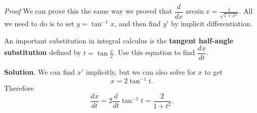 \documentclass[10pt,]{book}
\makeatletter
\newcommand{\terminology}[1]{\textbf{#1}}
\theoremstyle{ptxplainnotitle}
\theoremstyle{ptxplaintitle}
\theoremstyle{ptxplainnotitle}
\theoremstyle{ptxplaintitle}
\theoremstyle{ptxplainnotitle}
\theoremstyle{ptxplaintitle}
\renewcommand*{\proofname}{Proof}
\renewenvironment{proof}[1][\proofname]{\par
  \pushQED{\qed}%
  \normalfont \topsep6\p@\@plus6\p@\relax
  \trivlist
  \item\relax
    {\itshape
    #1\@addpunct{.}}\hspace\labelsep\ignorespaces
}{%
  \popQED\endtrivlist\@endpefalse
}
\theoremstyle{ptxdefinitionnotitle}
\theoremstyle{ptxdefinitiontitle}
\theoremstyle{ptxdefinitionnotitle}
\theoremstyle{ptxdefinitiontitle}
\theoremstyle{ptxdefinitionnotitle}
\theoremstyle{ptxdefinitiontitle}
\theoremstyle{ptxdefinitionnotitle}
\theoremstyle{ptxdefinitiontitle}
\theoremstyle{ptxdefinitionnotitle}
\theoremstyle{ptxdefinitiontitle}
\numberwithin{equation}{section}
\newcommand{\dv}[3][]{\dfrac{d^{#1} #2}{d #3^{#1}}}
\makeatother
\begin{document}
\begin{proof}\hypertarget{proof-7}{}
\hypertarget{p-279}{}%
We can prove this the same way we proved that \(\dv{}{x}\arcsin x = \frac{1}{\sqrt{1+x^{2}}}\). All we need to do is to set \(y = \tan^{-1}x\), and then find \(y'\) by implicit differentiation.%
\end{proof}
\begin{example}\label{example-tangent-half-angle-substitution}
\hypertarget{p-280}{}%
An important substitution in integral calculus is the \terminology{tangent half-angle substitution} defined by \(t = \tan\frac{x}{2}\). Use this equation to find \(\dv{x}{t}\).%
\par\smallskip%
\noindent\textbf{Solution}.\hypertarget{solution-61}{}\quad%
\hypertarget{p-281}{}%
We can find \(x'\) implicitly, but we can also solve for \(x\) to get%
\begin{equation*}
x = 2\tan^{-1}t.
\end{equation*}
Therefore%
\begin{equation*}
\dv{x}{t} = 2\dv{}{t}\tan^{-1}t = \frac{2}{1+t^{2}}.
\end{equation*}
%
\end{example}
\typeout{************************************************}
\typeout{************************************************}
\end{document}
